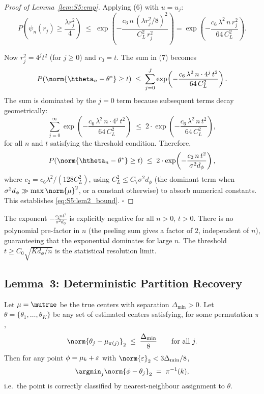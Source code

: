 \begin{proof}[Proof of Lemma~\ref{lem:S5:emp}]
Applying (6) with $u=u_j$:
\begin{equation}
P\!\left(\psi_n(r_j)\ge\frac{\lambda r_j^2}{4}\right)
\;\le\; \exp\!\left(
          -\frac{c_6\,n\,(\lambda r_j^2/8)^2}{C_L^2\,r_j^2}\right)
= \exp\!\left(-\frac{c_6\,\lambda^2\,n\,r_j^2}{64\,C_L^2}\right).
\tag{8}
\end{equation}

Now $r_j^2=4^j t^2$ (for $j\ge0$) and $r_0=t$.  The sum in (7) becomes
\[
P(\norm{\htheta_n-\theta^*}\ge t)
\;\le\; \sum_{j=0}^J
       \exp\!\left(-\frac{c_6\,\lambda^2\,n\cdot4^j\,t^2}{64\,C_L^2}\right).
\]
The sum is dominated by the $j=0$ term because subsequent terms decay
geometrically:
\[
\sum_{j=0}^\infty \exp\!\left(-\frac{c_6\,\lambda^2\,n\cdot4^j\,t^2}
                                   {64\,C_L^2}\right)
\;\le\; 2\cdot\exp\!\left(-\frac{c_6\,\lambda^2\,n\,t^2}{64\,C_L^2}\right),
\]
for all $n$ and $t$ satisfying the threshold condition.  Therefore,
\[
P(\norm{\htheta_n-\theta^*}\ge t)
\;\le\; 2\cdot\exp\!\left(-\frac{c_2\,n\,t^2}{\sigma^2 d_\phi}\right),
\]
where $c_2=c_6\lambda^2/(128 C_L^2)$, using
$C_L^2\le C_7\sigma^2 d_\phi$ (the dominant term when
$\sigma^2 d_\phi\gg\max\norm{\mu}^2$, or a constant otherwise) to
absorb numerical constants.  This establishes \eqref{eq:S5:lem2_bound}.
\hfill$\square$
\end{proof}

\begin{remark}
The exponent $-\frac{c_2 n t^2}{\sigma^2 d_\phi}$ is explicitly negative
for all $n>0$, $t>0$.  There is no polynomial pre-factor in $n$ (the
peeling sum gives a factor of $2$, independent of $n$), guaranteeing
that the exponential dominates for large $n$.  The threshold
$t\ge C_0\sqrt{K d_\phi/n}$ is the statistical resolution limit.
\end{remark}

\subsection{Lemma~3: Deterministic Partition Recovery}
\label{sec:S5:lem3}

\begin{lemma}
\label{lem:S5:part}
Let $\mu=\mutrue$ be the true centers with separation $\Delta_{\min}>0$.
Let $\theta=\{\theta_1,\dots,\theta_K\}$ be any set of estimated centers
satisfying, for some permutation $\pi$,
\[
\norm{\theta_j-\mu_{\pi(j)}}_2 \;\le\; \frac{\Delta_{\min}}{8}
\qquad \text{for all } j.
\]
Then for any point $\phi=\mu_k+\varepsilon$ with
$\norm{\varepsilon}_2<3\Delta_{\min}/8$,
\[
\argmin_{j}\norm{\phi-\theta_j}_2 \;=\; \pi^{-1}(k),
\]
i.e.\ the point is correctly classified by nearest-neighbour assignment to $\theta$.
\end{lemma}

